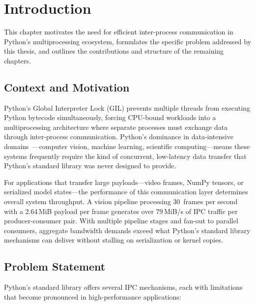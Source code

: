 \chapter{Introduction}
\label{chap:intro}

This chapter motivates the need for efficient inter-process communication in Python's multiprocessing ecosystem, formulates the specific problem addressed by this thesis, and outlines the contributions and structure of the remaining chapters.

\section{Context and Motivation}

Python's Global Interpreter Lock (GIL) prevents multiple threads from executing Python bytecode simultaneously, forcing CPU-bound workloads into a multiprocessing architecture where separate processes must exchange data through inter-process communication. Python's dominance in data-intensive domains~\cite{stackoverflow2024}---computer vision, machine learning, scientific computing---means these systems frequently require the kind of concurrent, low-latency data transfer that Python's standard library was never designed to provide.

For applications that transfer large payloads---video frames, NumPy tensors, or serialized model states---the performance of this communication layer determines overall system throughput. A vision pipeline processing 30~frames per second with a 2.64\,MiB payload per frame generates over 79\,MiB/s of IPC traffic per producer-consumer pair. With multiple pipeline stages and fan-out to parallel consumers, aggregate bandwidth demands exceed what Python's standard library mechanisms can deliver without stalling on serialization or kernel copies.

\newpage
\section{Problem Statement}
\label{sec:problem_statement}

Python's standard library offers several IPC mechanisms, each with limitations that become pronounced in high-performance applications:

